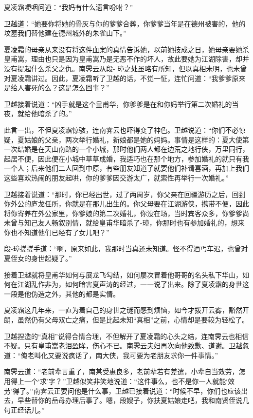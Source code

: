 \documentclass[12pt,oneside]{book}
\begin{document}
夏凌霜哽咽问道：``我妈有什么遗言吩咐？''

卫越道：``她要你将她的骨灰与你的爹爹合葬，你爹爹当年是在德州被害的，他的坟墓我们替他建在德州城外的朱雀山下。''

夏凌霜的母亲从来没有将这件血案的真情告诉她，以前她技成之日，她母亲要她杀皇甫嵩，理由也只是因为皇甫嵩乃是无恶不作的坏人，故此要她为江湖除害，却并没有提起什么杀父之仇。南霁云从段-
璋之处虽略有所知，但以真相未明，也未曾对夏凌霜讲过。因此，夏凌霜听了卫越的话，不觉一怔，连忙问道：``我爹爹原来是给人害死的么？这是怎么回事？''

卫越接着说道：``凶手就是这个皇甫华，你爹爹是在和你妈举行第二次婚礼的当夜，就给他暗杀了的。''

此言一出，不但夏凌霜惊骇，连南霁云也吓得变了神色。卫越说道：``你们不必惊疑，夏姑娘的父亲，两次举行婚礼，新娘都是她的妈妈。事情是这样的：夏大使第一次结婚是在天山南路的一个小城，那时他们两人都在边荒之地行侠，万里同行，起居不便，因此便在小城中草草成婚，我适巧也在那个地方，参加婚礼的就只有我一个人；后来他们二人回到中原，有些朋友知道了就要他们补请喜酒，再加上我们这些喜欢热闹的朋友起哄，你的爹爹因交游太广，就索性再举行一次婚礼。''

卫越接着说道：``那时，你已经出世，过了两周岁，你父亲在回疆游历之后，回到你外公的庐龙任所，你就是在那儿出生的。你父母要在江湖游侠，携带不便，因此将你寄养在外公家里，你爹娘的第二次婚礼，你没在场，当时宾客众多，你爹爹尚未曾与知己友人畅叙别情，就给皇甫华暗杀了-璋，你那时也有参加婚礼的，想来你也不知道他们已经有了女儿吧？''

段-璋搓搓手道：``啊，原来如此，我那时当真还未知道。怪不得酒丐车迟，也曾对夏侄女的身世起疑了。''

接着卫越就将皇甫华如何与展龙飞勾结，如何屡次冒着他哥哥的名头私下华山，如何在江湖乱作非为，如何暗害夏声涛的经过，一一说了出来。除了夏凌霜的身世这一段是他伪造之外，其他的都是实情。

夏凌霜这几年来，一直为着自己的身世之谜而感到烦恼，如今才拨开云雾，豁然开朗，虽然仍有父母双亡之痛，但是比起未知``真相''之前，心情却是要较为轻松了。

卫越捏造的``真相''说得合情合理，不但解开了夏凌霜的心头之结，连南霁云也相信不疑。只有皇甫嵩老泪盈眸，伤心不已。南霁云夫妇再次向他致歉、道谢。卫越忽道：``俺老叫化又要说疯话了，南大侠，我可要为老朋友求你一件事情。''

南霁云道：``老前辈言重了，南某受惠良多，老前辈若有差遣，小辈自当效劳，怎用得上一个`求'字？''卫越似笑非笑地说道：``这件事么，也不是你一人就能`效劳'得了。''南霁云正要问他是什么事，卫越已接着说道：``时候不早，你们也应该出去，早些替你的岳母办理后事了。嗯，段嫂子，你扶夏姑娘走吧，我和南贤侄说几句正经话儿。''
\end{document}
